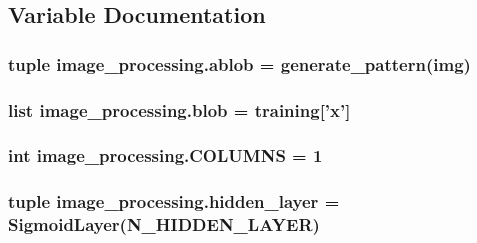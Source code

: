 \subsection{Variable Documentation}
\hypertarget{namespaceimage__processing_aeabf0234b61cf537988580f8015f7125}{
\subsubsection[{ablob}]{\setlength{\rightskip}{0pt plus 5cm}tuple image\-\_\-processing.\-ablob = {\bf generate\-\_\-pattern}({\bf img})}}\label{namespaceimage__processing_aeabf0234b61cf537988580f8015f7125}
\hypertarget{namespaceimage__processing_a093201f0548bb6f33c3d9f8acb98e58a}{
\subsubsection[{blob}]{\setlength{\rightskip}{0pt plus 5cm}list image\-\_\-processing.\-blob = {\bf training}\mbox{[}'x'\mbox{]}}}\label{namespaceimage__processing_a093201f0548bb6f33c3d9f8acb98e58a}
\hypertarget{namespaceimage__processing_a1991b46c33bd0e75519fa6f394097ea5}{
\subsubsection[{C\-O\-L\-U\-M\-N\-S}]{\setlength{\rightskip}{0pt plus 5cm}int image\-\_\-processing.\-C\-O\-L\-U\-M\-N\-S = 1}}\label{namespaceimage__processing_a1991b46c33bd0e75519fa6f394097ea5}
\hypertarget{namespaceimage__processing_a35b63551a480b64e520d2206511e29b2}{
\subsubsection[{hidden\-\_\-layer}]{\setlength{\rightskip}{0pt plus 5cm}tuple image\-\_\-processing.\-hidden\-\_\-layer = Sigmoid\-Layer({\bf N\-\_\-\-H\-I\-D\-D\-E\-N\-\_\-\-L\-A\-Y\-E\-R})}}\label{namespaceimage__processing_a35b63551a480b64e520d2206511e29b2}
